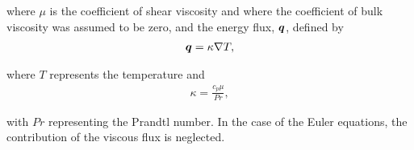 where $\mu$ is the coefficient of shear viscosity  and where the coefficient of bulk viscosity was assumed to be zero, and the energy flux, $\mathit{\bm{{q}}}$, defined by
\begin{align*}
\varv{q} = \kappa \nabla T,
\end{align*}

where $T$ represents the temperature and
\begin{align*}
\kappa = \frac{c_p \mu}{Pr},
\end{align*}

with $Pr$ representing the Prandtl number. In the case of the Euler equations, the contribution of the viscous flux is neglected. 

